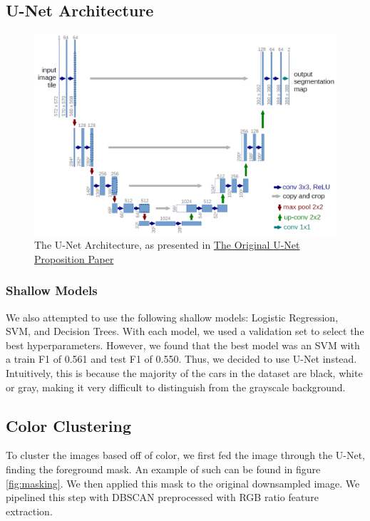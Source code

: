 \documentclass[paper=letter, fontsize=12pt]{article}
\numberwithin{equation}{section} %
\numberwithin{figure}{section} %
\numberwithin{table}{section} %
\begin{document}
\begin{appendixatend}
    \subsection{U-Net Architecture}
    \begin{figure}
        \centering
        \includegraphics[width=\textwidth]{./figs/unet_architecture.png}
        \caption{The U-Net Architecture, as presented in  \href{https://arxiv.org/pdf/1505.04597.pdf}{The Original U-Net Proposition Paper} }
        \label{fig:U-Net-architecture}
    \end{figure}
\end{appendixatend}

\subsubsection{Shallow Models}
We also attempted to use the following shallow models: Logistic Regression, SVM, and Decision Trees. With each model, we used a validation set to
select the best hyperparameters. However, we found that the best model was an SVM with a train F1 of 0.561 and test F1 of 0.550. Thus, we decided to
use U-Net instead. Intuitively, this is because the majority of the cars in the dataset are black, white or gray, making it very difficult to
distinguish from the grayscale background.

\subsection{Color Clustering}

To cluster the images based off of color, we first fed the image through the U-Net,
finding the foreground mask. An example of such can be found in figure \ref{fig:masking}.
We then applied this mask to the original downsampled image.
We pipelined this step with DBSCAN preprocessed with RGB ratio feature extraction.
\end{document}
